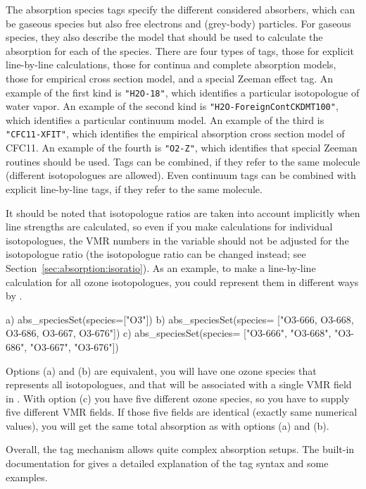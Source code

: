 The absorption species tags specify the different considered absorbers, which can
be gaseous species but also free electrons and (grey-body) particles.
For gaseous species, they also describe the model that should be used to
calculate the absorption for each of the species.
There are four types of tags, those for explicit line-by-line
calculations, those for continua and complete absorption models,
those for empirical cross section model, and a special Zeeman effect tag.
An example of the first kind is \verb|"H2O-18"|, which identifies a
particular isotopologue of water vapor. An example of the second kind is
\verb|"H2O-ForeignContCKDMT100"|, which identifies a particular continuum
model. An example of the third is \verb|"CFC11-XFIT"|, which identifies the
empirical absorption cross section model of CFC11.
An example of the fourth is \verb|"O2-Z"|, which identifies that special Zeeman
routines should be used.
Tags can be combined, if they refer to the same molecule
(different isotopologues are allowed). Even continuum tags can be combined
with explicit line-by-line tags, if they refer to the same molecule.

It should be noted that isotopologue ratios are taken into account
implicitly when line strengths are calculated, so even if you make
calculations for individual isotopologues, the VMR numbers in the
variable  should not be adjusted for the isotopologue
ratio (the isotopologue ratio can be changed instead; see
Section~\ref{sec:absorption:isoratio}). As an example, to make a line-by-line
calculation for all ozone isotopologues, you could represent them in different
ways by
.
\begin{code}
a) abs_speciesSet(species=["O3"])
b) abs_speciesSet(species=
                  ["O3-666, O3-668, O3-686, O3-667, O3-676"])
c) abs_speciesSet(species= 
                  ["O3-666", "O3-668", "O3-686", "O3-667", "O3-676"])
\end{code}
Options (a) and (b) are equivalent, you will have one ozone species
that represents all isotopologues, and that will be associated with a
single VMR field in .  With option (c) you have
five different ozone species, so you have to supply five different VMR
fields. If those five fields are identical (exactly same numerical
values), you will get the same total absorption as with options (a)
and (b).

Overall, the tag mechanism allows quite complex absorption setups. The built-in
documentation for  gives a detailed explanation of the
tag syntax and some examples.


